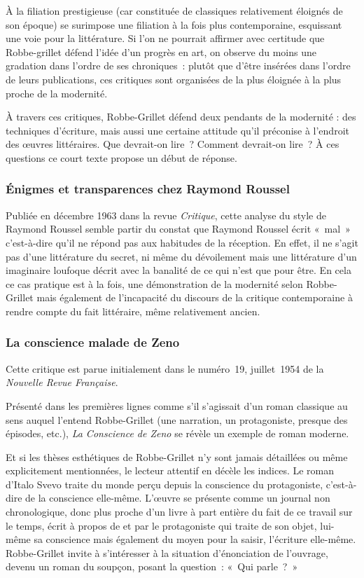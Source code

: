 \documentclass[12pt, a4paper]{article}
\begin{document}
À la filiation prestigieuse (car constituée de classiques relativement éloignés de son époque) se surimpose une filiation à la fois plus contemporaine, esquissant une voie pour la littérature. Si l'on ne pourrait affirmer avec certitude que Robbe-grillet défend l'idée d'un progrès en art, on observe du moins une gradation dans l'ordre de ses chroniques~: plutôt que d'être insérées dans l'ordre de leurs publications, ces critiques sont organisées de la plus éloignée à la plus proche de la modernité.

À travers ces critiques, Robbe-Grillet défend deux pendants de la modernité : des techniques d'écriture, mais aussi une certaine attitude qu'il préconise à l'endroit des œuvres littéraires. Que devrait-on lire~? Comment devrait-on lire~? À ces questions ce court texte propose un début de réponse.


\subsubsection{Énigmes et transparences chez Raymond Roussel}
Publiée en décembre 1963 dans la revue \textit{Critique}, cette analyse du style de Raymond Roussel semble partir du constat que Raymond Roussel écrit «~mal~» c'est-à-dire qu'il ne répond pas aux habitudes de la réception. En effet, il ne s'agit pas d'une littérature du secret, ni même du dévoilement mais une littérature d'un imaginaire loufoque décrit avec la banalité de ce qui n'est que pour être. En cela ce cas pratique est à la fois, une démonstration de la modernité selon Robbe-Grillet mais également de l'incapacité du discours de la critique contemporaine à rendre compte du fait littéraire, même relativement ancien.

\subsubsection{La conscience malade de Zeno}
Cette critique est parue initialement dans le numéro~19, juillet~1954 de la \textit{Nouvelle Revue Française}.

Présenté dans les premières lignes comme s'il s'agissait d'un roman classique au sens auquel l'entend Robbe-Grillet (une narration, un protagoniste, presque des épisodes, etc.), \textit{La Conscience de Zeno} se révèle un exemple de roman moderne.

Et si les thèses esthétiques de Robbe-Grillet n'y sont jamais détaillées ou même explicitement mentionnées, le lecteur attentif en décèle les indices. Le roman d'Italo Svevo traite du monde perçu depuis la conscience du protagoniste, c'est-à-dire de la conscience elle-même. L'œuvre se présente comme un journal non chronologique, donc plus proche d'un livre à part entière du fait de ce travail sur le temps, écrit à propos de et par le protagoniste qui traite de son objet, lui-même sa conscience mais également du moyen pour la saisir, l'écriture elle-même. Robbe-Grillet invite à s'intéresser à la situation d'énonciation de l'ouvrage, devenu un roman du soupçon, posant la question~: «~Qui parle~?~»
\end{document}
